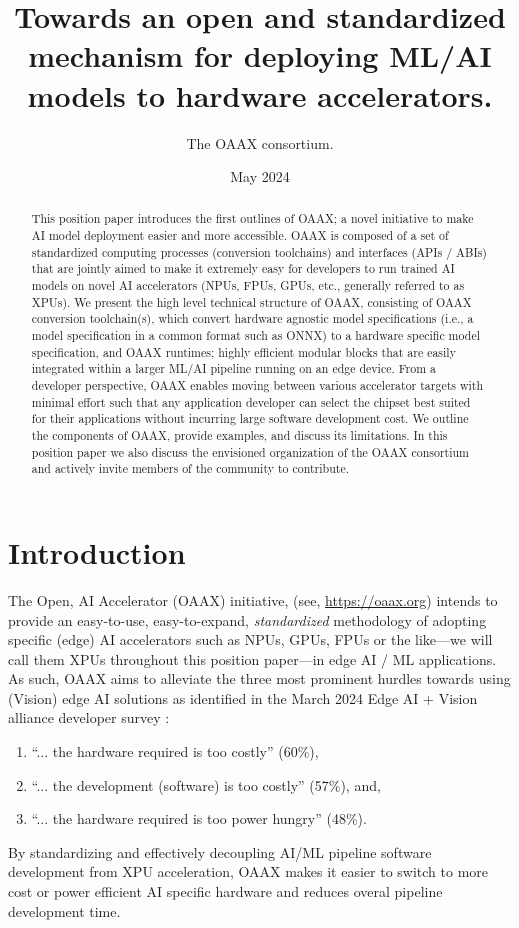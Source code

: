 \documentclass{article}
\newcommand{\oaaxweb}{\href{https://oaax.org}{https://oaax.org}}
\begin{document}
\title{Towards an open and standardized mechanism for deploying ML/AI models to hardware accelerators.}
\author{The OAAX consortium.}
\date{May 2024}
\maketitle

\begin{abstract}
This position paper introduces the first outlines of OAAX; a novel initiative to make AI model deployment easier and more accessible. OAAX is composed of a set of standardized computing processes (conversion toolchains) and interfaces (APIs / ABIs) that are jointly aimed to make it extremely easy for developers to run trained AI models on novel AI accelerators  (NPUs, FPUs, GPUs, etc., generally referred to as XPUs). We present the high level technical structure of OAAX, consisting of OAAX conversion toolchain(s), which convert hardware agnostic model specifications (i.e., a model specification in a common format such as ONNX) to a hardware specific model specification, and OAAX runtimes; highly efficient modular blocks that are easily integrated within a larger ML/AI pipeline running on an edge device. From a developer perspective, OAAX enables moving between various accelerator targets with minimal effort such that any application developer can select the chipset best suited for their applications without incurring large software development cost. We outline the components of OAAX, provide examples, and discuss its limitations. In this position paper we also discuss the envisioned organization of the OAAX consortium and actively invite members of the community to contribute.
\end{abstract}

\tableofcontents

\section{Introduction}

The Open, AI Accelerator (OAAX) initiative,  (see, \oaaxweb) intends to provide an easy-to-use, easy-to-expand, \emph{standardized} methodology of adopting specific (edge) AI accelerators such as NPUs, GPUs, FPUs or the like---we will call them XPUs throughout this position paper---in edge AI / ML applications. As such, OAAX aims to alleviate the three most prominent hurdles towards using (Vision) edge AI solutions as identified in the March 2024 Edge AI + Vision alliance developer survey \cite{EVS}:
\begin{enumerate}
\item ``... the hardware required is too costly'' (60\%),
\item ``... the development (software) is too costly'' (57\%), and,
\item ``... the hardware required is too power hungry'' (48\%).
\end{enumerate}
By standardizing and effectively decoupling AI/ML pipeline software development from XPU acceleration, OAAX makes it easier to switch to more cost or power efficient AI specific hardware and reduces overal pipeline development time.
\end{document}
